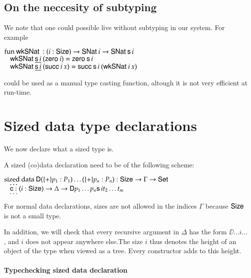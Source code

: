 \subsection{On the neccesity of subtyping}
We note that one could possible live without subtyping in our system.
For example 
\begin{bsp}
$\mathrm{fun}\: \mathsf{wkSNat}\: : (i : \mathsf{Size} ) \rightarrow \mathsf{SNat}\: i \rightarrow \mathsf{SNat}\: \mathsf{s}\, i$\\
$\hspace*{3mm} \mathsf{wkSNat}\: \underline{\mathsf{s}\, i} \: (\mathsf{zero}\: i) = \mathsf{zero}\: \mathsf{s}\, i$\\
$\hspace*{3mm} \mathsf{wkSNat}\: \underline{\mathsf{s}\, i} \: (\mathsf{succ}\: i \: x) = \mathsf{succ}\: \mathsf{s}\, i \: (\mathsf{wkSNat}\: i \: x) $
\end{bsp}
could be used as a manual type casting function, altough it is not very efficient at run-time.

\section{Sized data type declarations}

\newcommand{\sizecon}[4]{#1\vdash#2\mbox{ \textbf{sizeCon} }#3\:#4}
\newcommand{\sizeuse}[4]{#1\vdash#2\mbox{ \textbf{sizeUse} }#3\:#4}

We now declare what a sized type is.

A sized (co)data declaration need to be of the following scheme:
\begin{bsp}
$\mathrm{sized}\: \mathrm{data}\: \mathsf{D} ( \{+\} p_1 : P_1) \ldots ( \{+\} p_n : P_n) : \mathsf{Size} \rightarrow \Gamma \rightarrow \mathsf{Set} $\\
$\hspace*{3mm} \ldots$\\
$\hspace*{3mm} \mathsf{c} : (i : \mathsf{Size}) \rightarrow \Delta \rightarrow \mathsf{D} p_1 \ldots p_n \mathsf{s}\, i t_2 \ldots t_m$\\
$\hspace*{3mm} \ldots$\\   
\end{bsp}
For normal data declarations, sizes are not allowed in the indices $\Gamma$ because $\mathsf{Size}$ is not a small type.

In addition, we will check that every recursive argument in $\Delta$ has the form $\DD \ldots i \ldots $, and $i$ does not appear anywhere else.The size $i$ thus denotes the height of an object of the type when viewed as a tree. Every constructor adds to this height.

\paragraph*{Typechecking sized data declaration}

